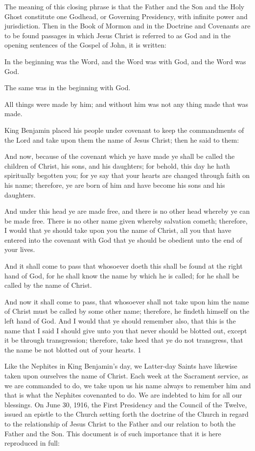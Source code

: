 The meaning of this closing phrase is that the Father and the Son and the Holy Ghost
constitute one Godhead, or Governing Presidency, with infinite power and jurisdiction. Then
in the Book of Mormon and in the Doctrine and Covenants are to be found passages in which
Jesus Christ is referred to as God and in the opening sentences of the Gospel of John, it is
written:

In the beginning was the Word, and the Word was with God, and the Word was God.

The same was in the beginning with God.

All things were made by him; and without him was not any thing made that was made.

King Benjamin placed his people under covenant to keep the commandments of the Lord and
take upon them the name of Jesus Christ; then he said to them:

And now, because of the covenant which ye have made ye shall be called the children of
Christ, his sons, and his daughters; for behold, this day he hath spiritually begotten you; for
ye say that your hearts are changed through faith on his name; therefore, ye are born of him
and have become his sons and his daughters.

And under this head ye are made free, and there is no other head whereby ye can be made
free. There is no other name given whereby salvation cometh; therefore, I would that ye
should take upon you the name of Christ, all you that have entered into the covenant with
God that ye should be obedient unto the end of your lives.

And it shall come to pass that whosoever doeth this shall be found at the right hand of God,
for he shall know the name by which he is called; for he shall be called by the name of
Christ.

And now it shall come to pass, that whosoever shall not take upon him the name of Christ
must be called by some other name; therefore, he findeth himself on the left hand of God.
And I would that ye should remember also, that this is the name that I said I should give unto
you that never should be blotted out, except it be through transgression; therefore, take heed
that ye do not transgress, that the name be not blotted out of your hearts. 1

Like the Nephites in King Benjamin's day, we Latter-day Saints have likewise taken upon
ourselves the name of Christ. Each week at the Sacrament service, as we are commanded to
do, we take upon us his name always to remember him and that is what the Nephites
covenanted to do. We are indebted to him for all our blessings. On June 30, 1916, the First
Presidency and the Council of the Twelve, issued an epistle to the Church setting forth the
doctrine of the Church in regard to the relationship of Jesus Christ to the Father and our
relation to both the Father and the Son. This document is of such importance that it is here
reproduced in full:

